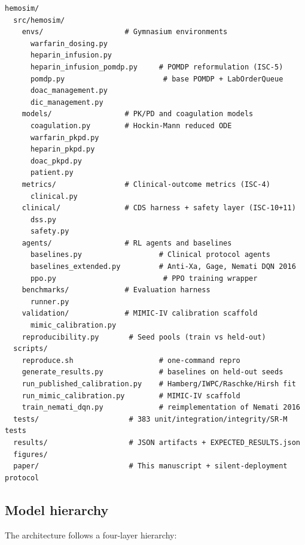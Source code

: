 \documentclass[11pt]{article}
\begin{document}
\begin{verbatim}
hemosim/
  src/hemosim/
    envs/                   # Gymnasium environments
      warfarin_dosing.py
      heparin_infusion.py
      heparin_infusion_pomdp.py     # POMDP reformulation (ISC-5)
      pomdp.py                       # base POMDP + LabOrderQueue
      doac_management.py
      dic_management.py
    models/                 # PK/PD and coagulation models
      coagulation.py        # Hockin-Mann reduced ODE
      warfarin_pkpd.py
      heparin_pkpd.py
      doac_pkpd.py
      patient.py
    metrics/                # Clinical-outcome metrics (ISC-4)
      clinical.py
    clinical/               # CDS harness + safety layer (ISC-10+11)
      dss.py
      safety.py
    agents/                 # RL agents and baselines
      baselines.py                  # Clinical protocol agents
      baselines_extended.py         # Anti-Xa, Gage, Nemati DQN 2016
      ppo.py                         # PPO training wrapper
    benchmarks/             # Evaluation harness
      runner.py
    validation/             # MIMIC-IV calibration scaffold
      mimic_calibration.py
    reproducibility.py       # Seed pools (train vs held-out)
  scripts/
    reproduce.sh                    # one-command repro
    generate_results.py             # baselines on held-out seeds
    run_published_calibration.py    # Hamberg/IWPC/Raschke/Hirsh fit
    run_mimic_calibration.py        # MIMIC-IV scaffold
    train_nemati_dqn.py             # reimplementation of Nemati 2016
  tests/                     # 383 unit/integration/integrity/SR-M tests
  results/                   # JSON artifacts + EXPECTED_RESULTS.json
  figures/
  paper/                     # This manuscript + silent-deployment protocol
\end{verbatim}

\subsection{Model hierarchy}

The architecture follows a four-layer hierarchy:
\end{document}
